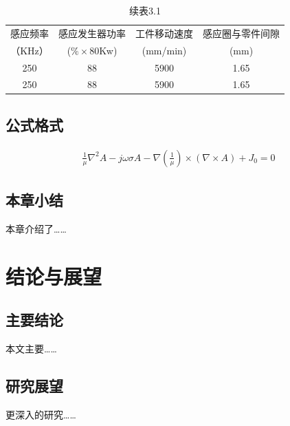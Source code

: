 \documentclass[UTF8,a4paper,12pt]{ctexart}
\numberwithin{equation}{section}
\begin{document}
\begin{table}[htbp]
\centering
\captionsetup{singlelinecheck=off}
\caption*{续表3.1}
\small
\begin{tabular}{c c c c}
\toprule
感应频率 &感应发生器功率 & 工件移动速度  &感应圈与零件间隙\\
（KHz）&($\% \times$80Kw) &(mm/min)  &(mm)\\
\midrule
250 &88 &5900 &1.65\\

250 &88 &5900 &1.65\\
\bottomrule
\end{tabular}
\end{table}
\vspace{\baselineskip}


\subsection{公式格式}


\begin{eqnarray}
\frac{1}{\mu} \nabla^2A - j \omega \sigma A -\nabla(\frac{1}{\mu}) \times(\nabla \times A)+J_0=0
\end{eqnarray}


\subsection{本章小结}
本章介绍了……

\newpage
{}
\section{结论与展望}

\subsection{主要结论}
本文主要……

\subsection{研究展望}
更深入的研究……

\newpage
{}

\renewcommand\refname{参考文献}
\end{document}
